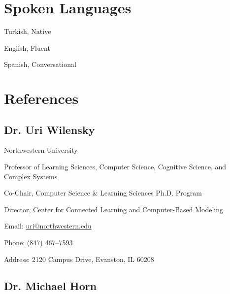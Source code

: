 \documentclass[11pt,letterpaper]{report} %
\newcommand{\listitemspace}{0.25em}
\renewenvironment{itemize}
{\begin{list}{}{\setlength{\leftmargin}{0em}
                \setlength{\parskip}{0em}
                \setlength{\itemsep}{\listitemspace}
                \setlength{\parsep}{\listitemspace}}}
{\end{list}}
\begin{document}
    \section*{Spoken Languages}

    \begin{itemize}

        \item Turkish, Native
        \item English, Fluent
        \item Spanish, Conversational

    \end{itemize}





    \section*{References}

    \subsection*{Dr. Uri Wilensky}

    \begin{itemize}

        \item Northwestern University
        \item Professor of Learning Sciences, Computer Science, Cognitive Science, and Complex Systems
        \item Co-Chair, Computer Science \& Learning Sciences Ph.D. Program
        \item Director, Center for Connected Learning and Computer-Based Modeling
        \item Email: \href{mailto:uri@northwestern.edu}{uri@northwestern.edu}
        \item Phone: (847) 467--7593
        \item Address: 2120 Campus Drive, Evanston, IL 60208

        \end{itemize}


    \subsection*{Dr. Michael Horn}
\end{document}
